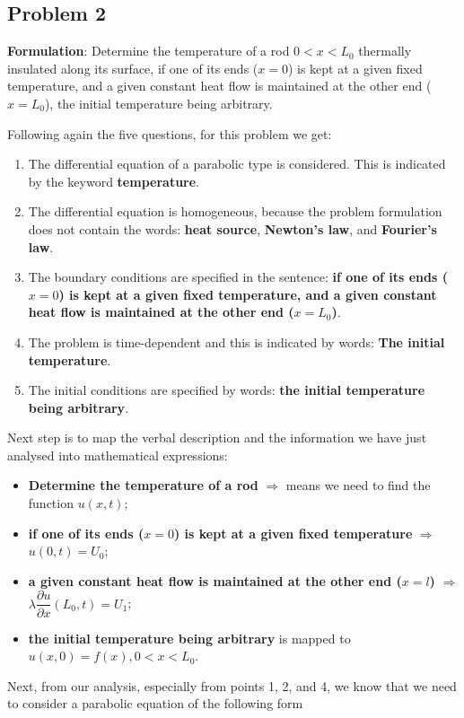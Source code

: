 \subsection{Problem 2}
{\bfseries Formulation}: Determine the temperature of a rod $0<x<L_{0}$ thermally insulated along its surface, if one of its ends ($x=0$) is kept at a given fixed temperature, and a given constant heat flow is maintained at the other end ($x=L_{0}$), the initial temperature being arbitrary.\par
Following again the five questions, for this problem we get:
\begin{enumerate}
\item The differential equation of a parabolic type is considered. This is indicated by the keyword {\bfseries temperature}.
\item The differential equation is homogeneous, because the problem formulation does not contain the words: {\bfseries heat source}, {\bfseries Newton's law}, and {\bfseries Fourier's law}.
\item The boundary conditions are specified in the sentence: {\bfseries if one of its ends ($x=0$) is kept at a given fixed temperature, and a given constant heat flow is maintained at the other end ($x=L_{0}$)}.
\item The problem is time-dependent and this is indicated by words: {\bfseries The initial temperature}.
\item The initial conditions are specified by words: {\bfseries the initial temperature being arbitrary}.
\end{enumerate}
Next step is to map the verbal description and the information we have just analysed into mathematical expressions:
\begin{itemize}
\item {\bfseries Determine the temperature of a rod} $\Longrightarrow$ means we need to find the function $u(x,t)$;
\item {\bfseries if one of its ends ($x=0$) is kept at a given fixed temperature} $\Longrightarrow$ $u(0,t)=U_{0}$;
\item {\bfseries a given constant heat flow is maintained at the other end ($x=l$)} $\Longrightarrow$ $\lambda \dfrac{\partial u}{\partial x}(L_{0},t)=U_{1}$;
\item {\bfseries the initial temperature being arbitrary} is mapped to $u(x,0)=f(x), 0<x<L_{0}$.
\end{itemize}
Next, from our analysis, especially from points 1, 2, and 4, we know that we need to consider a parabolic equation of the following form
